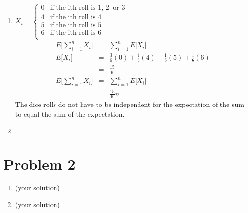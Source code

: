 \documentclass[12pt]{article}
\begin{document}
\begin{enumerate}[label=(\alph*)]
  \item
  $X_i = \left \{
     \begin{array}{ll}
       0 & \mbox{if the ith roll is 1, 2, or 3}\\
       4 & \mbox{if the ith roll is 4}\\
       5 & \mbox{if the ith roll is 5}\\
       6 & \mbox{if the ith roll is 6}\\
     \end{array}
   \right.
   $
  \begin{eqnarray*}
  E\biggl[\displaystyle\sum\limits_{i=1}^n X_i\biggr] &=& \displaystyle\sum\limits_{i=1}^n E\biggl[X_i\biggr]\\
  E\biggl[X_i\biggr] &=& \frac{3}{6} (0) + \frac{1}{6} (4) + \frac{1}{6} (5) + \frac{1}{6} (6) \\
  &=& \frac{15}{6}\\
  E\biggl[\displaystyle\sum\limits_{i=1}^n X_i\biggr] &=& \displaystyle\sum\limits_{i=1}^n E\biggl[X_i\biggr]\\
  &=& \frac{15}{6} n
  \end{eqnarray*}
  The dice rolls do not have to be independent for the expectation of the sum to equal the sum of the expectation.

  \item
  
\end{enumerate}

\section*{Problem 2}

\begin{enumerate}[label=(\alph*)]
  \item (your solution)
  \item (your solution)
\end{enumerate}
\end{document}
